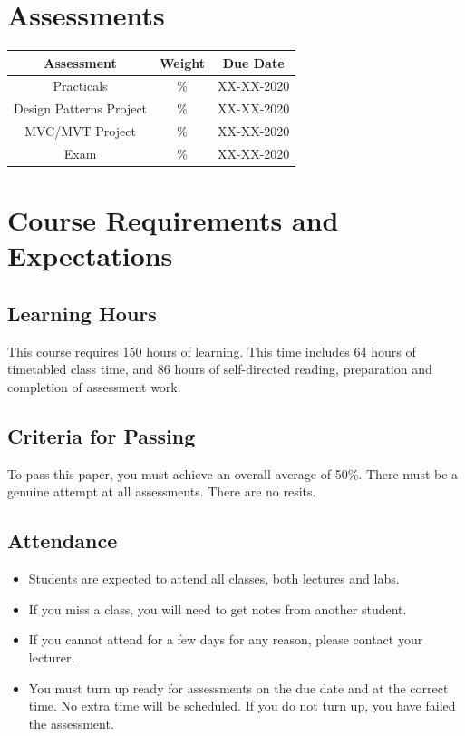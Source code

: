 \documentclass{article}
\begin{document}
\section*{Assessments}
\renewcommand{\arraystretch}{1.5}
\begin{tabular}{|c|c|c|}
	\hline
	\textbf{Assessment}     & \textbf{Weight} & \textbf{Due Date} \\ \hline
	Practicals              & \%              & XX-XX-2020        \\ \hline
	Design Patterns Project & \%              & XX-XX-2020        \\ \hline
	MVC/MVT Project         & \%              & XX-XX-2020        \\ \hline
	Exam                    & \%              & XX-XX-2020        \\ \hline
\end{tabular}

\section*{Course Requirements and Expectations}

\subsection*{Learning Hours}
This course requires 150 hours of learning. This time includes 64 hours of timetabled class time, and 86 hours of self-directed reading, preparation and completion of assessment work.

\subsection*{Criteria for Passing}
To pass this paper, you must achieve an overall average of 50\%. There must be a genuine attempt at all assessments. There are no resits.

\subsection*{Attendance}
\begin{itemize}
	\item Students are expected to attend all classes, both lectures and labs.
	\item If you miss a class, you will need to get notes from another student.
	\item If you cannot attend for a few days for any reason, please contact your lecturer.
	\item You must turn up ready for assessments on the due date and at the correct time. No extra time will be scheduled. If you do not turn up, you have failed the assessment.
\end{itemize}
\end{document}

